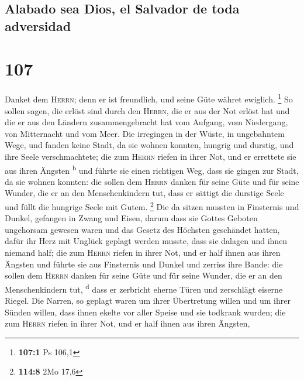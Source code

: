 \hypertarget{alabado-sea-dios-el-salvador-de-toda-adversidad}{%
\subsection{Alabado sea Dios, el Salvador de toda
adversidad}\label{alabado-sea-dios-el-salvador-de-toda-adversidad}}

\hypertarget{section-106}{%
\section{107}\label{section-106}}

 Danket dem \textsc{Herrn}; denn er ist freundlich, und
seine Güte währet ewiglich. \footnote{\textbf{107:1} Ps 106,1}
 So sollen sagen, die erlöst sind durch den
\textsc{Herrn}, die er aus der Not erlöst hat  und die er
aus den Ländern zusammengebracht hat vom Aufgang, vom Niedergang, von
Mitternacht und vom Meer.  Die irregingen in der Wüste, in
ungebahntem Wege, und fanden keine Stadt, da sie wohnen konnten,
 hungrig und durstig, und ihre Seele verschmachtete;
 die zum \textsc{Herrn} riefen in ihrer Not, und er
errettete sie aus ihren Ängsten \textsuperscript{b}  und
führte sie einen richtigen Weg, dass sie gingen zur Stadt, da sie wohnen
konnten:  die sollen dem \textsc{Herrn} danken für seine
Güte und für seine Wunder, die er an den Menschenkindern tut,
 dass er sättigt die durstige Seele und füllt die hungrige
Seele mit Gutem. \footnote{\textbf{114:8} 2Mo 17,6}  Die
da sitzen mussten in Finsternis und Dunkel, gefangen in Zwang und Eisen,
 darum dass sie Gottes Geboten ungehorsam gewesen waren
und das Gesetz des Höchsten geschändet hatten,  dafür ihr
Herz mit Unglück geplagt werden musste, dass sie dalagen und ihnen
niemand half;  die zum \textsc{Herrn} riefen in ihrer
Not, und er half ihnen aus ihren Ängsten  und führte sie
aus Finsternis und Dunkel und zerriss ihre Bande:  die
sollen dem \textsc{Herrn} danken für seine Güte und für seine Wunder,
die er an den Menschenkindern tut, \textsuperscript{d} 
dass er zerbricht eherne Türen und zerschlägt eiserne Riegel.
 Die Narren, so geplagt waren um ihrer Übertretung willen
und um ihrer Sünden willen,  dass ihnen ekelte vor aller
Speise und sie todkrank wurden;  die zum \textsc{Herrn}
riefen in ihrer Not, und er half ihnen aus ihren Ängsten,
